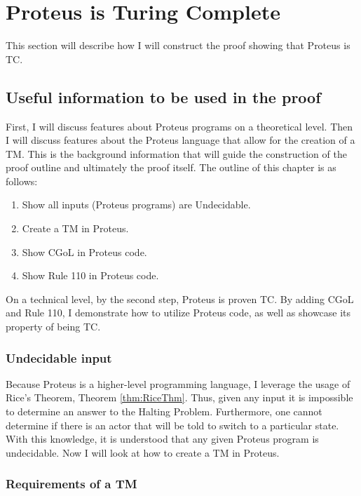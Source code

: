 \chapter{Proteus is Turing Complete}\label{chapter:ProteusTC}

This section will describe how I will construct the proof showing that Proteus is TC.

\section{Useful information to be used in the proof}

First, I will discuss features about Proteus programs on a theoretical level.
Then I will discuss features about the Proteus language that allow for the creation of a TM.
This is the background information that will guide the construction of the proof outline and ultimately the proof itself.
The outline of this chapter is as follows:

\begin{enumerate}
    \item Show all inputs (Proteus programs) are Undecidable.
    \item Create a TM in Proteus.
    \item Show CGoL in Proteus code.
    \item Show Rule 110 in Proteus code.
\end{enumerate}

On a technical level, by the second step, Proteus is proven TC.
By adding CGoL and Rule 110, I demonstrate how to utilize Proteus code, as well as showcase its property of being TC.

\subsection{Undecidable input}\label{subsec:UndecidableInput}

Because Proteus is a higher-level programming language, I leverage the usage of Rice's Theorem, Theorem \ref{thm:RiceThm}.
Thus, given any input it is impossible to determine an answer to the Halting Problem.
Furthermore, one cannot determine if there is an actor that will be told to switch to a particular state.
With this knowledge, it is understood that any given Proteus program is undecidable.
Now I will look at how to create a TM in Proteus.

\subsection{Requirements of a TM}\label{subsec:ReqsofTM}

